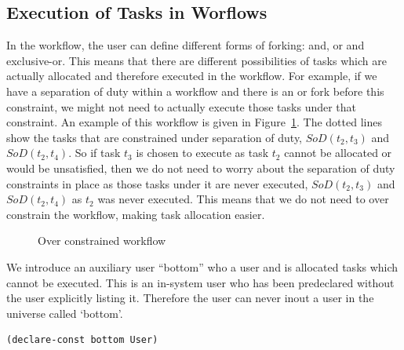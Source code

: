 \documentclass[a4paper]{report}
\begin{document}
\subsection{Execution of Tasks in Worflows}
In the workflow, the user can define different forms of forking: and, or and exclusive-or. This means that there are different possibilities of tasks which are actually allocated and therefore executed in the workflow. For example, if we have a separation of duty within a workflow and there is an or fork before this constraint, we might not need to actually execute those tasks under that constraint. An example of this workflow is given in Figure~\ref{fig:Over constrained workflow}. The dotted lines show the tasks that are constrained under separation of duty, $SoD(t_2, t_3)$ and $SoD(t_2, t_4)$. So if task $t_3$ is chosen to execute as task $t_2$ cannot be allocated or would be unsatisfied, then we do not need to worry about the separation of duty constraints in place as those tasks under it are never executed, $SoD(t_2, t_3)$ and $SoD(t_2, t_4)$ as $t_2$ was never executed. This means that we do not need to over constrain the workflow, making task allocation easier.
\begin{figure}[!htb]
\centering
{}
\caption{Over constrained workflow}
\label{fig:Over constrained workflow}
\end{figure}

We introduce an auxiliary user ``bottom'' who a user and is allocated tasks which cannot be executed. This is an in-system user who has been predeclared without the user explicitly listing it. Therefore the user can never inout a user in the universe called `bottom'.
\begin{lstlisting}[frame=single]
(declare-const bottom User)
\end{lstlisting}
\end{document}
